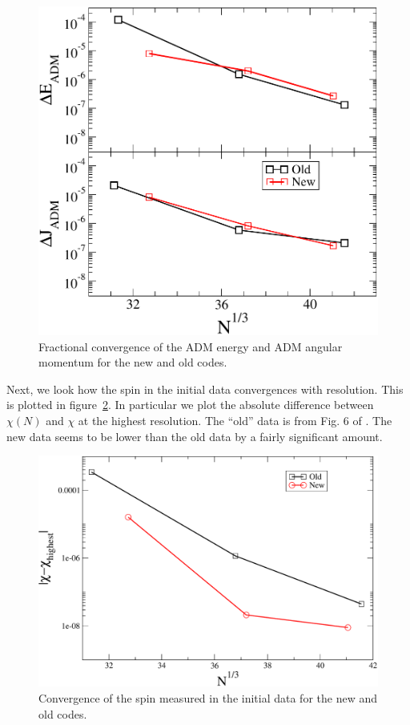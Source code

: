 \begin{figure}[!ht]
\includegraphics[width=0.95\columnwidth]{chap6/EADMConvergence}
\caption{\label{fig:EADMConvergence} Fractional convergence of the ADM
energy and ADM angular momentum for the new and old codes.}
\end{figure}

Next, we look how the spin in the initial data convergences with
resolution. This is plotted in figure~\ref{fig:NewSpinConvergence}. In
particular we plot the absolute difference between $\chi(N)$ and
$\chi$ at the highest resolution. The ``old'' data is from Fig. 6 of
\cite{Tacik:2015tja}. The new data seems to be lower than the old data
by a fairly significant amount.

\begin{figure}[!ht]
\includegraphics[width=0.95\columnwidth]{chap6/NewSpinConvergence}
\caption{\label{fig:NewSpinConvergence} Convergence of the spin
  measured in the initial data for the new and old codes.}
\end{figure}

